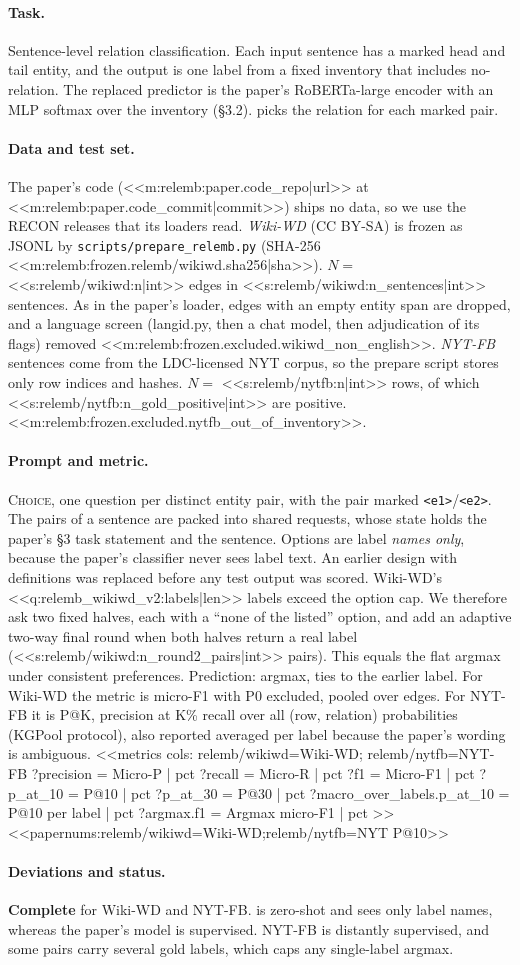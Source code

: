 \paragraph{Task.} Sentence-level relation classification. Each input sentence has a marked head and tail entity,
and the output is one label from a fixed inventory that includes no-relation. The replaced predictor is the
paper's RoBERTa-large encoder with an MLP softmax over the inventory (\S3.2). \jev{} picks the relation for each
marked pair.

\paragraph{Data and test set.} The paper's code (<<m:relemb:paper.code_repo|url>> at
<<m:relemb:paper.code_commit|commit>>) ships no data, so we use the RECON releases that its loaders read.
\emph{Wiki-WD} (CC BY-SA) is frozen as JSONL by \texttt{scripts/\allowbreak{}prepare\_relemb.py} (SHA-256 <<m:relemb:frozen.relemb/wikiwd.sha256|sha>>). $N=$
<<s:relemb/wikiwd:n|int>> edges in <<s:relemb/wikiwd:n_sentences|int>> sentences. As in the paper's loader,
edges with an empty entity span are dropped, and a language screen (langid.py, then a chat model, then
adjudication of its flags) removed <<m:relemb:frozen.excluded.wikiwd_non_english>>. \emph{NYT-FB} sentences come from the
LDC-licensed NYT corpus, so the prepare script stores only row indices and hashes. $N=$ <<s:relemb/nytfb:n|int>> rows, of
which <<s:relemb/nytfb:n_gold_positive|int>> are positive. <<m:relemb:frozen.excluded.nytfb_out_of_inventory>>.

\paragraph{Prompt and metric.} \textsc{Choice}, one question per distinct entity pair, with the pair marked
\texttt{<e1>}/\texttt{<e2>}. The pairs of a sentence are packed into shared requests, whose state holds the
paper's \S3 task statement and the sentence. Options are label \emph{names only}, because the paper's
classifier never sees label text. An earlier design with definitions was replaced before any test output was
scored. Wiki-WD's <<q:relemb_wikiwd_v2:labels|len>> labels exceed the option cap. We therefore ask two fixed
halves, each with a ``none of the listed'' option, and add an adaptive two-way final round when both halves
return a real label (<<s:relemb/wikiwd:n_round2_pairs|int>> pairs). This equals the flat argmax under
consistent preferences. Prediction: argmax, ties to the earlier label. For Wiki-WD the metric is micro-F1 with
P0 excluded, pooled over edges. For NYT-FB it is P@K, precision at K\% recall over all (row, relation)
probabilities (KGPool protocol), also reported averaged per label because the paper's wording is ambiguous.
<<metrics
cols: relemb/wikiwd=Wiki-WD; relemb/nytfb=NYT-FB
?precision = Micro-P | pct
?recall = Micro-R | pct
?f1 = Micro-F1 | pct
?p_at_10 = P@10 | pct
?p_at_30 = P@30 | pct
?macro_over_labels.p_at_10 = P@10 per label | pct
?argmax.f1 = Argmax micro-F1 | pct
>>
<<papernums:relemb/wikiwd=Wiki-WD;relemb/nytfb=NYT P@10>>

\paragraph{Deviations and status.} \textbf{Complete} for Wiki-WD and NYT-FB. \jev{} is zero-shot and sees only label names, whereas the paper's
model is supervised. NYT-FB is distantly supervised, and some pairs carry several gold labels, which caps any
single-label argmax.
